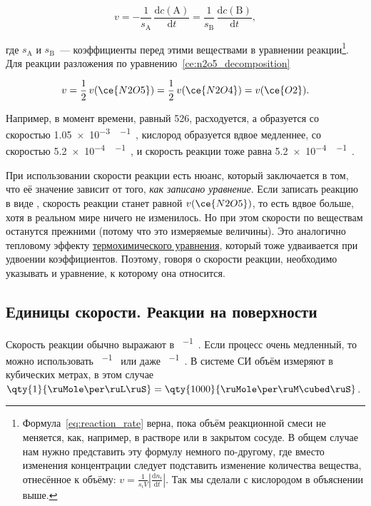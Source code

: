 \begin{equation}
    \label{eq:reaction_rate}
    \boxed{v = -\frac{1}{s_{\mathrm{A}}}\,\frac{\mathrm{d}c(\mathrm{A})}{\mathrm{d}t} = \frac{1}{s_{\mathrm{B}}}\,\frac{\mathrm{d}c(\mathrm{B})}{\mathrm{d}t}},
\end{equation}

где $s_{\mathrm{A}}$ и $s_{\mathrm{B}}$~--- коэффициенты перед этими веществами в уравнении реакции\footnote{Формула~\eqref{eq:reaction_rate} верна, пока объём реакционной смеси не меняется, как, например, в растворе или в закрытом сосуде. В общем случае нам нужно представить эту формулу немного по-другому, где вместо изменения концентрации следует подставить изменение количества вещества, отнесённое к объёму: $v = \frac{1}{s_i V}\left|\frac{\mathrm{d}n_i}{\mathrm{d}t}\right|$. Так мы сделали с кислородом в объяснении выше.}. Для реакции разложения  по уравнению~\eqref{ce:n2o5_decomposition}

\begin{equation*}
    v = \frac{1}{2}\,v(\ce{N2O5}) = \frac{1}{2}\,v(\ce{N2O4}) = v(\ce{O2}).
\end{equation*}

Например, в момент времени, равный \qty{526}{\ruS},  расходуется, а  образуется со скоростью \qty{1,05e-3}{\ruMole\per\ruL\ruS}, кислород образуется вдвое медленнее, со скоростью \qty{5,2e-4}{\ruMole\per\ruL\ruS}, и скорость реакции тоже равна \qty{5,2e-4}{\ruMole\per\ruL\ruS}.

При использовании скорости реакции есть нюанс, который заключается в том, что её значение зависит от того, \emph{как записано уравнение}. Если записать реакцию в виде , скорость реакции станет равной $v(\ce{N2O5})$, то есть вдвое больше, хотя в реальном мире ничего не изменилось. Но при этом скорости по веществам останутся прежними (потому что это измеряемые величины). Это аналогично тепловому эффекту \hyperref[term:thermochemical_equation]{термохимического уравнения}, который тоже удваивается при удвоении коэффициентов. Поэтому, говоря о скорости реакции, необходимо указывать и уравнение, к которому она относится.

\subsection*{Единицы скорости. Реакции на поверхности}

Скорость реакции обычно выражают в \unit{\ruMole\per\ruL\ruS}. Если процесс очень медленный, то можно использовать \unit{\ruMole\per\ruL\ruMin} или даже \unit{\ruMole\per\ruL\ruCh}. В системе СИ объём измеряют в кубических метрах, в этом случае $\qty{1}{\ruMole\per\ruL\ruS} = \qty{1000}{\ruMole\per\ruM\cubed\ruS}$.

